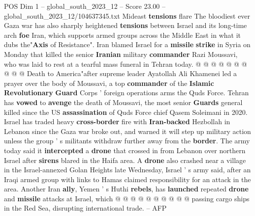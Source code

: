 \begin{textsample}{POS Dim 1 – global\_south\_2023\_12 – Score 23.00 – global\_south\_2023\_12/104637345.txt}
Mideast \textbf{tensions} flare The bloodiest ever Gaza war has also sharply heightened \textbf{tensions} between Israel and its long-time arch \textbf{foe} Iran, which supports armed groups across the Middle East in what it dubs the"\textbf{Axis} of Resistance".
Iran blamed Israel for a \textbf{missile} \textbf{strike} in Syria on Monday that killed the senior \textbf{Iranian} military \textbf{commander} Razi Moussavi, who was laid to rest at a tearful mass funeral in Tehran today. @ @ @ @ @ @ @ @ @ @ Death to America"after supreme leader Ayatollah Ali Khamenei led a prayer over the body of Moussavi, a top \textbf{commander} of the \textbf{Islamic} \textbf{Revolutionary} \textbf{Guard} Corps ' foreign operations arms the Quds Force.
Tehran has \textbf{vowed} to \textbf{avenge} the death of Moussavi, the most senior \textbf{Guards} general killed since the US \textbf{assassination} of Quds Force chief Qasem Soleimani in 2020.
Israel has traded heavy \textbf{cross-border} fire with \textbf{Iran-backed} Hezbollah in Lebanon since the Gaza war broke out, and warned it will step up military action unless the group ' s militants withdraw further away from the \textbf{border}.
The army today said it \textbf{intercepted} a \textbf{drone} that crossed in from Lebanon over northern Israel after \textbf{sirens} blared in the Haifa area.
A \textbf{drone} also crashed near a village in the Israel-annexed Golan Heights late Wednesday, Israel ' s army said, after an Iraqi armed group with links to Hamas claimed responsibility for an attack in the area.
Another Iran \textbf{ally}, Yemen ' s Huthi \textbf{rebels}, has \textbf{launched} repeated \textbf{drone} and \textbf{missile} attacks at Israel, which @ @ @ @ @ @ @ @ @ @ passing cargo ships in the Red Sea, disrupting international trade. -- AFP

\end{textsample}
